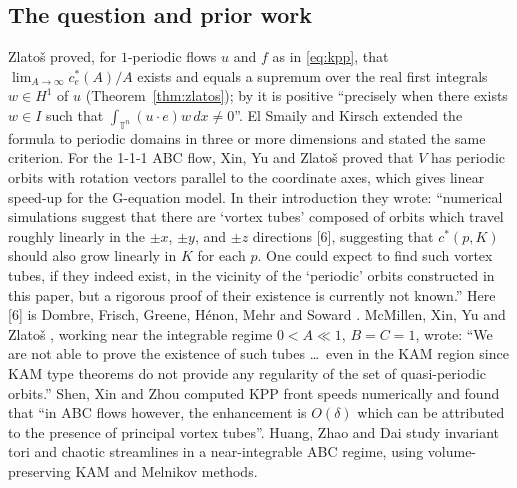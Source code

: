 \documentclass[11pt]{article}
\theoremstyle{definition}
\theoremstyle{remark}
\newcommand{\T}{\mathbb{T}}
\begin{document}
\subsection{The question and prior work}
Zlatoš \cite[Theorem~1.1]{Z} proved, for $1$-periodic flows $u$ and $f$ as in
\eqref{eq:kpp}, that $\lim_{A\to\infty}c^*_e(A)/A$ exists and equals a
supremum over the real first integrals $w\in H^1$ of $u$ (Theorem~\ref{thm:zlatos});
by \cite[Remark~3]{Z} it is positive ``precisely when there exists $w\in I$
such that $\int_{\T^n}(u\cdot e)w\,dx\ne0$''. El Smaily and Kirsch
\cite[Theorem~B and Remark~2]{ESK} extended the formula to periodic domains in
three or more dimensions and stated the same criterion. For the 1-1-1 ABC
flow, Xin, Yu and Zlatoš \cite{XYZ} proved that $V$ has periodic orbits with
rotation vectors parallel to the coordinate axes, which gives linear
speed-up for the G-equation model. In their introduction they wrote:
``numerical simulations suggest that there are `vortex tubes' composed of
orbits which travel roughly linearly in the $\pm x$, $\pm y$, and $\pm z$
directions [6], suggesting that $c^*(p,K)$ should also grow linearly in $K$
for each $p$. One could expect to find such vortex tubes, if they indeed
exist, in the vicinity of the `periodic' orbits constructed in this paper, but
a rigorous proof of their existence is currently not known.'' Here [6] is
Dombre, Frisch, Greene, Hénon, Mehr and Soward \cite{DFGHMS}. McMillen, Xin,
Yu and Zlatoš \cite[Section~1]{MXYZ}, working near the integrable regime
$0<A\ll1$, $B=C=1$, wrote: ``We are not able to prove the existence of such
tubes \dots\ even in the KAM region since KAM type theorems do not provide any
regularity of the set of quasi-periodic orbits.'' Shen, Xin and Zhou
\cite{SXZ} computed KPP front speeds numerically and found that ``in ABC
flows however, the enhancement is $O(\delta)$ which can be attributed to the
presence of principal vortex tubes''. Huang, Zhao and Dai \cite{HZD} study
invariant tori and chaotic streamlines in a near-integrable ABC regime,
using volume-preserving KAM and Melnikov methods.
\end{document}
